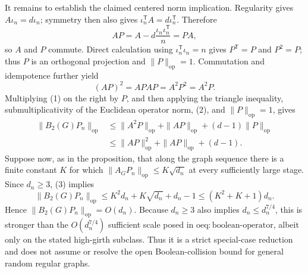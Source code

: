 It remains to establish the claimed centered norm implication.  Regularity gives
\(A\iota_n=d\iota_n\); symmetry then also gives
\(\iota_n^{\mathsf T}A=d\iota_n^{\mathsf T}\).  Therefore
\[
AP=A-d\frac{\iota_n\iota_n^{\mathsf T}}n=PA,
\]
so \(A\) and \(P\) commute.  Direct calculation using
\(\iota_n^{\mathsf T}\iota_n=n\) gives \(P^{\mathsf T}=P\) and \(P^2=P\); thus \(P\) is an orthogonal projection and \(\|P\|_{\mathrm{op}}=1\).  Commutation and idempotence further yield
\[
(AP)^2=APAP=A^2P^2=A^2P.
\tag{2}
\]
Multiplying (1) on the right by \(P\), and then applying the triangle inequality, submultiplicativity of the Euclidean operator norm, (2), and \(\|P\|_{\mathrm{op}}=1\), gives
\[
\begin{aligned}
\|B_2(G)P_n\|_{\mathrm{op}}
&\le \|A^2P\|_{\mathrm{op}}+\|AP\|_{\mathrm{op}}
 +(d-1)\|P\|_{\mathrm{op}}\\
&\le \|AP\|_{\mathrm{op}}^2+\|AP\|_{\mathrm{op}}+(d-1).
\end{aligned}
\tag{3}
\]
Suppose now, as in the proposition, that along the graph sequence there is a finite constant \(K\) for which
\(\|A_GP_n\|_{\mathrm{op}}\le K\sqrt{d_n}\) at every sufficiently large stage.  Since \(d_n\ge3\), (3) implies
\[
\|B_2(G)P_n\|_{\mathrm{op}}
\le K^2d_n+K\sqrt{d_n}+d_n-1
\le (K^2+K+1)d_n.
\]
Hence \(\|B_2(G)P_n\|_{\mathrm{op}}=O(d_n)\).  Because \(d_n\ge3\) also implies \(d_n\le d_n^{7/4}\), this is stronger than the \(O(d_n^{7/4})\) sufficient scale posed in \(\mathrm{oeq{:}boolean\mbox{-}operator}\), albeit only on the stated high-girth subclass.  Thus it is a strict special-case reduction and does not assume or resolve the open Boolean-collision bound for general random regular graphs.

